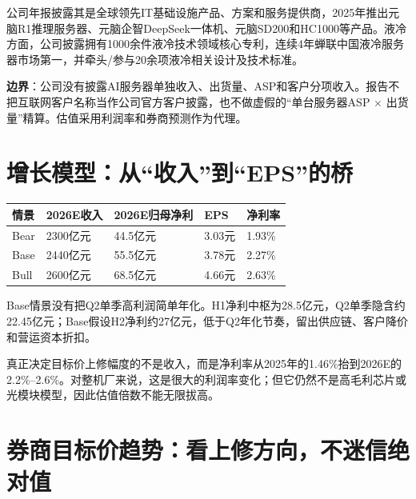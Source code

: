 \documentclass[a4paper,11pt,fontset=none]{ctexart}
\begin{document}
公司年报披露其是全球领先IT基础设施产品、方案和服务提供商，2025年推出元脑R1推理服务器、元脑企智DeepSeek一体机、元脑SD200和HC1000等产品。液冷方面，公司披露拥有1000余件液冷技术领域核心专利，连续4年蝉联中国液冷服务器市场第一，并牵头/参与20余项液冷相关设计及技术标准。

\textbf{边界}：公司没有披露AI服务器单独收入、出货量、ASP和客户分项收入。报告不把互联网客户名称当作公司官方客户披露，也不做虚假的“单台服务器ASP $\times$ 出货量”精算。估值采用利润率和券商预测作为代理。

\section{增长模型：从“收入”到“EPS”的桥}

\begin{exhibitbox}
\begin{tabularx}{\exhibitboxwidth}{L{2.4cm}XXXX}
\toprule
\textbf{情景} & \textbf{2026E收入} & \textbf{2026E归母净利} & \textbf{EPS} & \textbf{净利率} \\
\midrule
Bear & 2300亿元 & 44.5亿元 & 3.03元 & 1.93\% \\
Base & 2440亿元 & 55.5亿元 & 3.78元 & 2.27\% \\
Bull & 2600亿元 & 68.5亿元 & 4.66元 & 2.63\% \\
\bottomrule
\end{tabularx}
\end{exhibitbox}

Base情景没有把Q2单季高利润简单年化。H1净利中枢为28.5亿元，Q2单季隐含约22.45亿元；Base假设H2净利约27亿元，低于Q2年化节奏，留出供应链、客户降价和营运资本折扣。

真正决定目标价上修幅度的不是收入，而是净利率从2025年的1.46\%抬到2026E的2.2\%--2.6\%。对整机厂来说，这是很大的利润率变化；但它仍然不是高毛利芯片或光模块模型，因此估值倍数不能无限拔高。

\section{券商目标价趋势：看上修方向，不迷信绝对值}
\end{document}
